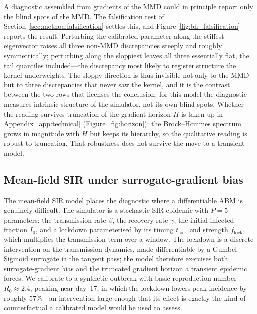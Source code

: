 \documentclass[10pt,twocolumn]{article}
\begin{document}
A diagnostic assembled from gradients of the MMD could in principle report only the
blind spots of the MMD. The falsification test of
Section~\ref{sec:method:falsification} settles this, and
Figure~\ref{fig:bh_falsification} reports the result. Perturbing the calibrated
parameter along the stiffest eigenvector raises all three non-MMD discrepancies
steeply and roughly symmetrically; perturbing along the sloppiest leaves all three
essentially flat, the tail quantiles included---the discrepancy most likely to
register structure the kernel underweights. The sloppy direction is thus invisible
not only to the MMD but to three discrepancies that never saw the kernel, and it is
the contrast between the two rows that licenses the conclusion: for this model the
diagnostic measures intrinsic structure of the simulator, not its own blind spots.
Whether the reading survives truncation of the gradient horizon $H$ is taken up in
Appendix~\ref{app:technical} (Figure~\ref{fig:horizon}): the Brock--Hommes spectrum
grows in magnitude with $H$ but keeps its hierarchy, so the qualitative reading is
robust to truncation. That robustness does not survive the move to a transient model.

\subsection{Mean-field SIR under surrogate-gradient bias}
\label{sec:exp:sir}

The mean-field SIR model places the diagnostic where a differentiable ABM is
genuinely difficult. The simulator is a stochastic SIR epidemic with $P=5$
parameters: the transmission rate $\beta$, the recovery rate $\gamma$, the initial
infected fraction $I_0$, and a lockdown parameterised by its timing $t_{\mathrm{lock}}$
and strength $f_{\mathrm{lock}}$, which multiplies the transmission term over a window.
The lockdown is a discrete intervention on the transmission dynamics, made
differentiable by a Gumbel-Sigmoid surrogate in the tangent pass; the model therefore
exercises both surrogate-gradient bias and the truncated gradient horizon a transient
epidemic forces. We calibrate to a synthetic outbreak with basic reproduction number
$R_0 \approx 2.4$, peaking near day~17, in which the lockdown lowers peak incidence by
roughly $57\%$---an intervention large enough that its effect is exactly the kind of
counterfactual a calibrated model would be used to assess.
\end{document}
